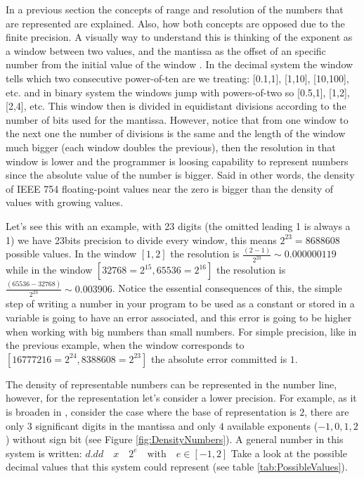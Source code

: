 In a previous section the concepts of range and resolution of the numbers that are represented are explained. Also, how both concepts are opposed due to the finite precision. A visually way to understand this is thinking of the exponent as a window between two values, and the mantissa as the offset of an specific number from the initial value of the window \cite{VisExpl}. In the decimal system the window tells which two consecutive power-of-ten are we treating: [0.1,1], [1,10], [10,100], etc. and in binary system the windows jump with powers-of-two so [0.5,1], [1,2], [2,4], etc. This window then is divided in equidistant divisions according to the number of bits used for the mantissa. However, notice that from one window to the next one the number of divisions is the same and the length of the window much bigger (each window doubles the previous), then the resolution in that window is lower and the programmer is loosing capability to represent numbers since the absolute value of the number is bigger. Said in other words, the density of IEEE 754 floating-point values near the zero is bigger than the density of values with growing values. 

Let's see this with an example, with 23 digits (the omitted leading 1 is always a 1) we have 23bits precision to divide every window, this means $2^{23} = 8688608$ possible values. In the window $\left[1,2\right]$ the resolution is $\frac{\left(2-1\right)}{2^{23}} \sim 0.000000119$ while in the window $\left[32768=2^{15},65536=2^{16}\right]$ the resolution is $\frac{\left(65536-32768\right)}{2^{23}} \sim 0.003906$. Notice the essential consequences of this, the simple step of writing a number in your program to be used as a constant or stored in a variable is going to have an error associated, and this error is going to be higher when working with big numbers than small numbers. For simple precision, like in the previous example, when the window corresponds to $\left[16777216=2^{24},8388608=2^{23}\right]$ the absolute error committed is $1$. 

The density of representable numbers can be represented in the number line, however, for the representation let's consider a lower precision. For example, as it is broaden in \cite{articleIEEE}, consider the case where the base of representation is $2$, there are only $3$ significant digits in the mantissa and only $4$ available exponents ($-1, 0, 1, 2$) without sign bit (see Figure \ref{fig:DensityNumbers}). A general number in this system is written: $d.dd \quad x \quad 2^{e}\quad \textrm{with}\quad e \in \left[-1, 2\right] $ Take a look at the possible decimal values that this system could represent (see table \ref{tab:PossibleValues}).

